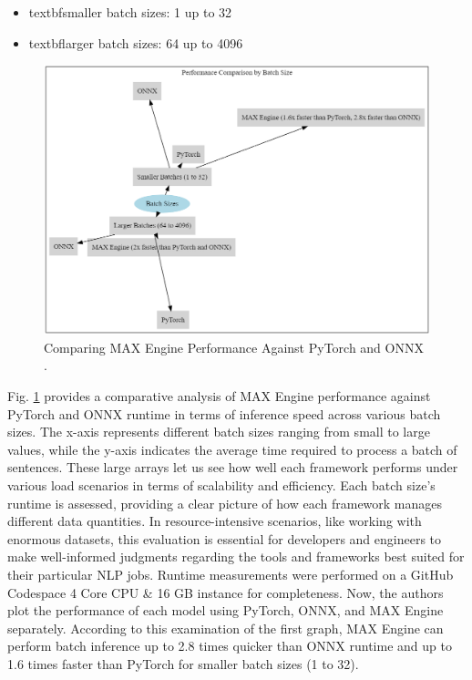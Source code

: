 \documentclass[conference]{IEEEtran}
\begin{document}
\begin{itemize}
    \item textbf{smaller batch sizes}: 1 up to 32
    \item textbf{larger batch sizes}: 64 up to 4096
\end{itemize}

\begin{figure}[H]
    \centerline{\includegraphics[width=\linewidth]{6.png}}
    \caption{Comparing MAX Engine Performance Against PyTorch and ONNX .}
    \label{fig6}
\end{figure}

Fig. \ref{fig6} provides a comparative analysis of MAX Engine performance against PyTorch and ONNX runtime in terms of inference speed across various batch sizes. The x-axis represents different batch sizes ranging from small to large values, while the y-axis indicates the average time required to process a batch of sentences.     
These large arrays let us see how well each framework performs under various load scenarios in terms of scalability and efficiency. Each batch size's runtime is assessed, providing a clear picture of how each framework manages different data quantities. In resource-intensive scenarios, like working with enormous datasets, this evaluation is essential for developers and engineers to make well-informed judgments regarding the tools and frameworks best suited for their particular NLP jobs. Runtime measurements were performed on a GitHub Codespace 4 Core CPU \& 16 GB instance for completeness.
Now, the authors plot the performance of each model using PyTorch, ONNX, and MAX Engine separately. According to this examination of the first graph, MAX Engine can perform batch inference up to 2.8 times quicker than ONNX runtime and up to 1.6 times faster than PyTorch for smaller batch sizes (1 to 32).
\end{document}
